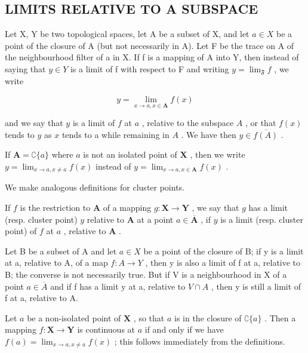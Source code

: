 \subsection{LIMITS RELATIVE TO A SUBSPACE}

Let X, Y be two topological spaces, let A be a subset of X, and let \(a \in X\) be a point of the closure of A (but not necessarily in A). Let F be the trace on A of the neighbourhood filter of a in X. If f is a mapping of A into Y, then instead of saying that \(y \in Y\) is a limit of f with respect to F and writing \(y = \lim_{\mathfrak{F}} f\) , we write

\[
y = \lim _ {x \to a, x \in \mathbf {A}} f (x)
\]

and we say that \(y\) is a limit of \(f\) at \(a\) , relative to the subspace \(A\) , or that \(f(x)\) tends to \(y\) as \(x\) tends to a while remaining in \(A\) . We have then \(y \in \overline{f(A)}\) .

If \(\mathbf{A} = \complement\{a\}\) where \(a\) is not an isolated point of \(\mathbf{X}\) , then we write \(y = \lim_{x\to a,x\neq a}f(x)\) instead of \(y = \lim_{x\to a,x\in \mathbf{A}}f(x)\) .

We make analogous definitions for cluster points.

If \(f\) is the restriction to \(\mathbf{A}\) of a mapping \(g: \mathbf{X} \to \mathbf{Y}\) , we say that \(g\) has a limit (resp. cluster point) \(y\) relative to \(\mathbf{A}\) at a point \(a \in \overline{\mathbf{A}}\) , if \(y\) is a limit (resp. cluster point) of \(f\) at \(a\) , relative to \(\mathbf{A}\) .

Let B be a subset of A and let \(a \in X\) be a point of the closure of B; if y is a limit at a, relative to A, of a map \(f: A \to Y\) , then y is also a limit of f at a, relative to B; the converse is not necessarily true. But if V is a neighbourhood in X of a point \(a \in \overline{A}\) and if f has a limit y at a, relative to \(V \cap A\) , then y is still a limit of f at a, relative to A.

Let \(a\) be a non-isolated point of \(\mathbf{X}\) , so that \(a\) is in the closure of \(\complement\{a\}\) . Then a mapping \(f: \mathbf{X} \to \mathbf{Y}\) is continuous at \(a\) if and only if we have \(f(a) = \lim_{x \to a, x \neq a} f(x)\) ; this follows immediately from the definitions.

